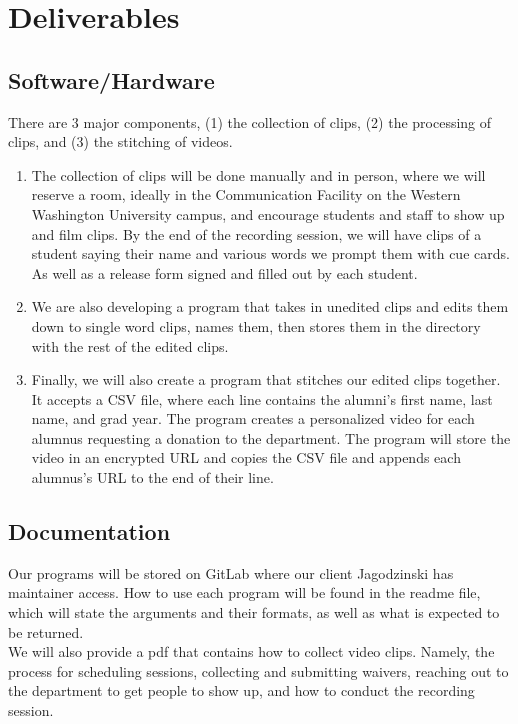 \section{Deliverables}

\subsection{Software/Hardware}
There are 3 major components, (1) the collection of clips, (2) the processing of clips,
and (3) the stitching of videos.
\begin{enumerate}
    \item The collection of clips will be done manually and in person, where we will
    reserve a room, ideally in the Communication Facility on the Western Washington
    University campus, and encourage students and staff to show up and film clips.
    By the end of the recording session, we will have clips of a student saying 
    their name and various words we prompt them with cue cards. As well as a 
    release form signed and filled out by each student.
    \item We are also developing a program that takes in unedited clips and edits 
    them down to single word clips, names them, then stores them in the directory 
    with the rest of the edited clips.
    \item Finally, we will also create a program that stitches our edited clips
    together. It accepts a CSV file, where each line contains the alumni's first 
    name, last name, and grad year. The program creates a personalized video for 
    each alumnus requesting a donation to the department. The program will store 
    the video in an encrypted URL and copies the CSV file and appends each alumnus's
    URL to the end of their line.
\end{enumerate}

\subsection{Documentation}
Our programs will be stored on GitLab where our client Jagodzinski has maintainer
access. How to use each program will be found in the readme file, which will state 
the arguments and their formats, as well as what is expected to be returned.\\
We will also provide a pdf that contains how to collect video clips. Namely, the 
process for scheduling sessions, collecting and submitting waivers, reaching out 
to the department to get people to show up, and how to conduct the recording session.

